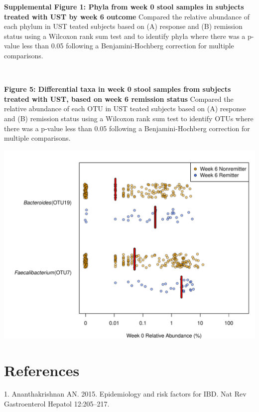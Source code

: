 \documentclass[11pt,]{article}
\begin{document}
\newpage

\textbf{Supplemental Figure 1: Phyla from week 0 stool samples in
subjects treated with UST by week 6 outcome} Compared the relative
abundance of each phylum in UST teated subjects based on (A) response
and (B) remission status using a Wilcoxon rank sum test and to identify
phyla where there was a p-value less than 0.05 following a
Benjamini-Hochberg correction for multiple comparisons.

\includegraphics{figures/SF1_wk6phyla.pdf}

\newpage

\textbf{Figure 5: Differential taxa in week 0 stool samples from
subjects treated with UST, based on week 6 remission status} Compared
the relative abundance of each OTU in UST teated subjects based on (A)
response and (B) remission status using a Wilcoxon rank sum test to
identify OTUs where there was a p-value less than 0.05 following a
Benjamini-Hochberg correction for multiple comparisons.

\includegraphics{figures/Figure5_basesigOTUabund.REMISSwk6.pdf}

\newpage

\section*{References}\label{references}

\hypertarget{refs}{}
\hypertarget{ref-ananthakrishnan_epidemiology_2015}{}
1. Ananthakrishnan AN. 2015. Epidemiology and risk factors for IBD. Nat
Rev Gastroenterol Hepatol 12:205--217.
\end{document}
